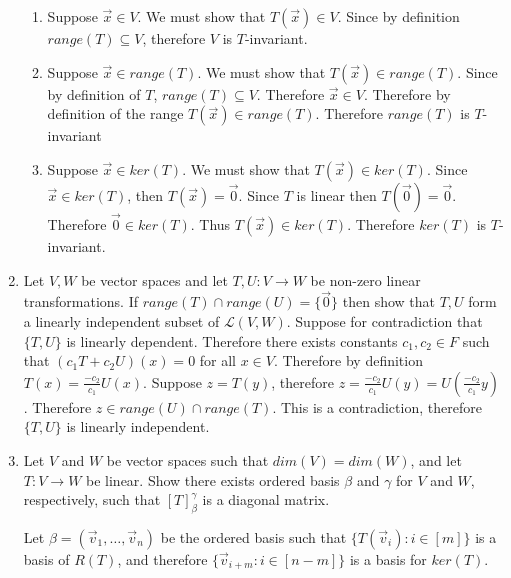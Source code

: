 \documentclass[12pt, letterpaper]{article}
\begin{document}
\begin{enumerate}
\begin{enumerate}
			\item Suppose $\Vec{x} \in V$.  We must show that $T(\Vec{x}) \in V$.  Since by definition $range(T) \subseteq V$, therefore $V$ is $T$-invariant.  
			\item Suppose $\Vec{x} \in range(T)$.  We must show that $T(\Vec{x}) \in range(T).$  Since by definition of $T$, $range(T) \subseteq V$.  Therefore $\Vec{x} \in V$.  Therefore by definition of the range $T(\Vec{x}) \in range(T)$.  Therefore $range(T)$ is $T$-invariant
			\item Suppose $\Vec{x} \in ker(T)$.  We must show that $T(\Vec{x}) \in ker(T)$.  Since $\Vec{x} \in ker(T)$, then $T(\Vec{x}) = \Vec{0}$.  Since $T$ is linear then $T(\Vec{0}) = \Vec{0}$.  Therefore $\Vec{0} \in ker(T)$.  Thus $T(\Vec{x}) \in ker(T)$.  Therefore $ker(T)$ is $T$-invariant.  
		\end{enumerate}
		\newpage
		\item Let $V,W$ be vector spaces and let $T,U: V\to W$ be non-zero linear transformations.  If $range(T) \cap range(U) = \{\Vec{0}\}$ then show that $T,U$ form a linearly independent subset of $\mathcal{L}(V,W)$.
		Suppose for contradiction that $\{T,U\}$ is linearly dependent.  Therefore there exists constants $c_1,c_2 \in F$ such that $(c_1 T + c_2 U)(x) = 0$ for all $x \in V$. Therefore by definition $T(x) = \frac{-c_2}{c_1} U(x)$.  Suppose $z = T(y)$, therefore $z = \frac{-c_2}{c_1} U(y) = U(\frac{-c_2}{c_1} y)$.  Therefore $z \in range(U) \cap range(T)$.  This is a contradiction, therefore $\{T,U\}$ is linearly independent.  
		\newpage
		\item Let $V$ and $W$ be vector spaces such that $dim(V) = dim(W)$, and let $T: V \to W$ be linear.  Show there exists ordered basis $\beta$ and $\gamma$ for $V$ and $W$, respectively, such that $[T]_\beta^\gamma$ is a diagonal matrix.
		
		Let $\beta = (\Vec{v}_1,\ldots,\Vec{v}_n)$ be the ordered basis such that $\{T(\Vec{v}_i) : i \in [m]\}$ is a basis of $R(T)$, and therefore        $\{\Vec{v}_{i+m}: i\in [n-m]\}$ is a basis for $ker(T)$.  
		
		  
\end{enumerate}
\end{document}
